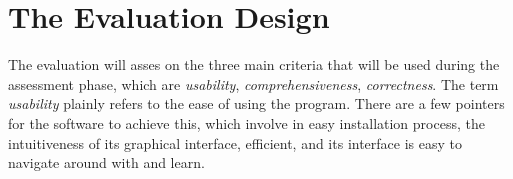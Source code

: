 

\newpage




\section{The Evaluation Design}


The evaluation will asses on the three main criteria that will be used during the assessment phase, which are \textit{usability}, \textit{comprehensiveness}, \textit{correctness}. The term \textit{usability} plainly refers to the ease of using the program. There are a few pointers for the software to achieve this, which involve in easy installation process, the intuitiveness of its graphical interface, efficient, and its interface is easy to navigate around with and learn.

